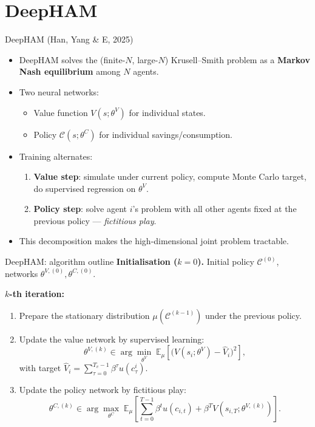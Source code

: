 \documentclass[10pt,english,aspectratio=169]{beamer}
\begin{document}

\section{DeepHAM}

\begin{frame}{DeepHAM (Han, Yang \& E, 2025)}
\begin{itemize}
\item DeepHAM solves the (finite-$N$, large-$N$) Krusell--Smith problem as a \textbf{Markov Nash equilibrium} among $N$ agents.
\medskip
\item Two neural networks:
  \begin{itemize}
  \item Value function $V(s;\theta^V)$ for individual states.
  \item Policy $\mathcal{C}(s;\theta^C)$ for individual savings/consumption.
  \end{itemize}
\medskip
\item Training alternates:
  \begin{enumerate}
  \item \textbf{Value step}: simulate under current policy, compute Monte Carlo target, do supervised regression on $\theta^V$.
  \item \textbf{Policy step}: solve agent $i$'s problem with all other agents fixed at the previous policy --- \emph{fictitious play}.
  \end{enumerate}
\medskip
\item This decomposition makes the high-dimensional joint problem tractable.
\end{itemize}
\end{frame}

\begin{frame}{DeepHAM: algorithm outline}
\textbf{Initialisation ($k=0$).} Initial policy $\mathcal{C}^{(0)}$, networks $\theta^{V,(0)}, \theta^{C,(0)}$.
\medskip

\textbf{$k$-th iteration:}
\begin{enumerate}
\item Prepare the stationary distribution $\mu(\mathcal{C}^{(k-1)})$ under the previous policy.
\medskip
\item Update the value network by supervised learning:
\[
\theta^{V,(k)} \in \arg\min_{\theta^V}\;
\mathbb{E}_\mu\!\left[\big(V(s_i;\theta^V) - \hat V_i\big)^2\right],
\]
with target $\hat V_i = \sum_{\tau=0}^{T_v-1}\beta^\tau u(c_\tau^i)$.
\medskip
\item Update the policy network by fictitious play:
\[
\theta^{C,(k)} \in \arg\max_{\theta^C}\;
\mathbb{E}_\mu\!\left[\sum_{t=0}^{T-1}\beta^t u(c_{i,t}) + \beta^T V(s_{i,T};\theta^{V,(k)})\right].
\]
\end{enumerate}
\end{frame}
\end{document}

